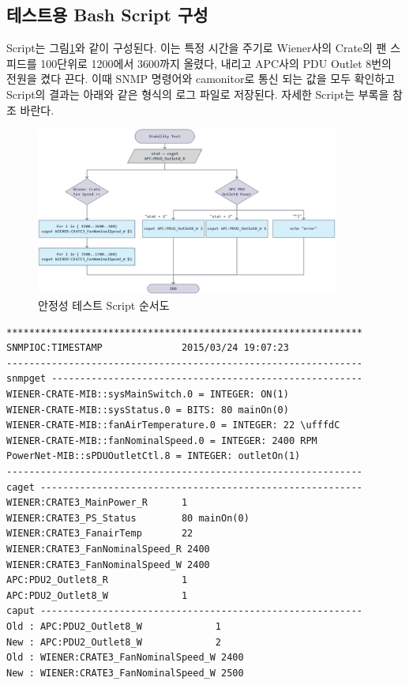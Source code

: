 \documentclass[11pt
  , a4paper
  , article
  , oneside
]{memoir}
\begin{document}
\subsection{테스트용 Bash Script 구성}

Script는 그림\ref{fig:stability}와 같이 구성된다. 이는 특정 시간을 주기로 Wiener사의 Crate의 팬 스피드를 100단위로 1200에서 3600까지 올렸다, 내리고 APC사의 PDU Outlet 8번의 전원을 켰다 끈다. 이때 SNMP 명령어와 camonitor로 통신 되는 값을 모두 확인하고 Script의 결과는 아래와 같은 형식의 로그 파일로 저장된다. 자세한 Script는 부록을 참조 바란다.

\begin{figure}[h!]
  \centering
  \includegraphics[width=0.89\textwidth]{./images/stability.eps}
  \caption{안정성 테스트 Script 순서도}
  \label{fig:stability}   
\end{figure}

\begin{lstlisting}[style=termstyle]
***************************************************************
SNMPIOC:TIMESTAMP              2015/03/24 19:07:23
---------------------------------------------------------------
snmpget -------------------------------------------------------
WIENER-CRATE-MIB::sysMainSwitch.0 = INTEGER: ON(1)
WIENER-CRATE-MIB::sysStatus.0 = BITS: 80 mainOn(0) 
WIENER-CRATE-MIB::fanAirTemperature.0 = INTEGER: 22 \ufffdC
WIENER-CRATE-MIB::fanNominalSpeed.0 = INTEGER: 2400 RPM
PowerNet-MIB::sPDUOutletCtl.8 = INTEGER: outletOn(1)
---------------------------------------------------------------
caget ---------------------------------------------------------
WIENER:CRATE3_MainPower_R      1
WIENER:CRATE3_PS_Status        80 mainOn(0)
WIENER:CRATE3_FanairTemp       22
WIENER:CRATE3_FanNominalSpeed_R 2400
WIENER:CRATE3_FanNominalSpeed_W 2400
APC:PDU2_Outlet8_R             1
APC:PDU2_Outlet8_W             1
caput ---------------------------------------------------------
Old : APC:PDU2_Outlet8_W             1
New : APC:PDU2_Outlet8_W             2
Old : WIENER:CRATE3_FanNominalSpeed_W 2400
New : WIENER:CRATE3_FanNominalSpeed_W 2500
\end{lstlisting}
\end{document}
